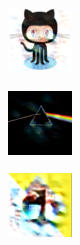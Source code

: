 \begin{figure}[!h]
\centering
\begin{subfigure}{.19\linewidth}
  \centering
  \includegraphics[width=0.7\linewidth]{imgs/4}
\end{subfigure}%
\begin{subfigure}{.19\linewidth}
  \centering
  \includegraphics[width=0.7\linewidth]{imgs/7}
\end{subfigure}
\begin{subfigure}{.19\linewidth}
  \centering
  \includegraphics[width=0.7\linewidth]{imgs/10}

\end{subfigure}
\end{figure}
